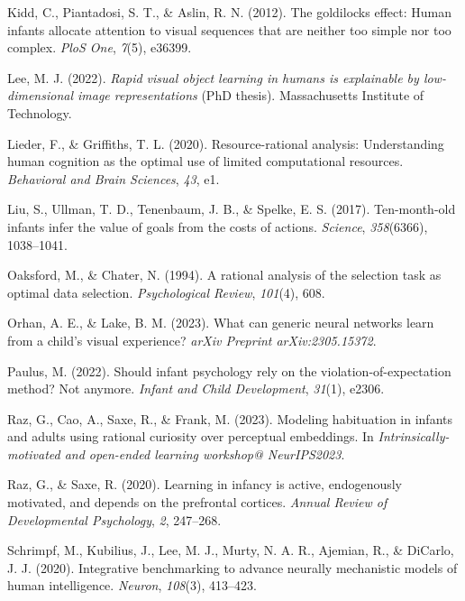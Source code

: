 \documentclass[10pt, letterpaper]{article}
\newenvironment{CSLReferences}%
  {}%
  {\par}
\begin{document}
\begin{CSLReferences}{1}{0}
\leavevmode{}%
Kidd, C., Piantadosi, S. T., \& Aslin, R. N. (2012). The goldilocks
effect: Human infants allocate attention to visual sequences that are
neither too simple nor too complex. \emph{PloS One}, \emph{7}(5),
e36399.

\leavevmode{}%
Lee, M. J. (2022). \emph{Rapid visual object learning in humans is
explainable by low-dimensional image representations} (PhD thesis).
Massachusetts Institute of Technology.

\leavevmode{}%
Lieder, F., \& Griffiths, T. L. (2020). Resource-rational analysis:
Understanding human cognition as the optimal use of limited
computational resources. \emph{Behavioral and Brain Sciences},
\emph{43}, e1.

\leavevmode{}%
Liu, S., Ullman, T. D., Tenenbaum, J. B., \& Spelke, E. S. (2017).
Ten-month-old infants infer the value of goals from the costs of
actions. \emph{Science}, \emph{358}(6366), 1038--1041.

\leavevmode{}%
Oaksford, M., \& Chater, N. (1994). A rational analysis of the selection
task as optimal data selection. \emph{Psychological Review},
\emph{101}(4), 608.

\leavevmode{}%
Orhan, A. E., \& Lake, B. M. (2023). What can generic neural networks
learn from a child's visual experience? \emph{arXiv Preprint
arXiv:2305.15372}.

\leavevmode{}%
Paulus, M. (2022). Should infant psychology rely on the
violation-of-expectation method? Not anymore. \emph{Infant and Child
Development}, \emph{31}(1), e2306.

\leavevmode{}%
Raz, G., Cao, A., Saxe, R., \& Frank, M. (2023). Modeling habituation in
infants and adults using rational curiosity over perceptual embeddings.
In \emph{Intrinsically-motivated and open-ended learning workshop@
NeurIPS2023}.

\leavevmode{}%
Raz, G., \& Saxe, R. (2020). Learning in infancy is active, endogenously
motivated, and depends on the prefrontal cortices. \emph{Annual Review
of Developmental Psychology}, \emph{2}, 247--268.

\leavevmode{}%
Schrimpf, M., Kubilius, J., Lee, M. J., Murty, N. A. R., Ajemian, R., \&
DiCarlo, J. J. (2020). Integrative benchmarking to advance neurally
mechanistic models of human intelligence. \emph{Neuron}, \emph{108}(3),
413--423.


\end{CSLReferences}
\end{document}
